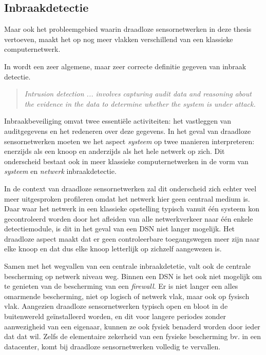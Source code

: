 \subsection{Inbraakdetectie}

Maar ook het probleemgebied waarin draadloze sensornetwerken in deze thesis
vertoeven, maakt het op nog meer vlakken verschillend van een klassieke
computernetwerk.

In \citep{zhang2000intrusion} wordt een zeer algemene, maar zeer correcte
definitie gegeven van inbraak detectie.

\begin{quote}
\emph{Intrusion detection ... involves capturing audit data and reasoning about
the evidence in the data to determine whether the system is under attack.}
\end{quote}

Inbraakbeveiliging omvat twee essenti\"ele activiteiten: het vastleggen van
auditgegevens en het redeneren over deze gegevens. In het geval van draadloze
sensornetwerken moeten we het aspect \emph{systeem} op twee manieren
interpreteren: enerzijds als een knoop en anderzijds als het hele netwerk op
zich. Dit onderscheid bestaat ook in meer klassieke computernetwerken in de
vorm van \emph{systeem} en \emph{netwerk} inbraakdetectie.

In de context van draadloze sensornetwerken zal dit onderscheid zich echter
veel meer uitgesproken profileren omdat het netwerk hier geen centraal medium
is. Daar waar het netwerk in een klassieke opstelling typisch vanuit \'e\'en
systeem kon gecontroleerd worden door het afleiden van alle netwerkverkeer naar
\'e\'en enkele detectiemodule, is dit in het geval van een DSN niet langer
mogelijk. Het draadloze aspect maakt dat er geen controleerbare toegangswegen
meer zijn naar elke knoop en dat dus elke knoop letterlijk op zichzelf
aangewezen is.

Samen met het wegvallen van een centrale inbraakdetetie, valt ook de centrale
bescherming op netwerk niveau weg. Binnen een DSN is het ook niet mogelijk om
te genieten van de bescherming van een \emph{firewall}. Er is niet langer een
alles omarmende bescherming, niet op logisch of netwerk vlak, maar ook op
fysisch vlak. Aangezien draadloze sensornetwerken typisch open en bloot in de
buitenwereld ge\"installeerd worden, en dit voor langere periodes zonder
aanwezigheid van een eigenaar, kunnen ze ook fysiek benaderd worden door ieder
dat dat wil. Zelfs de elementaire zekerheid van een fysieke bescherming bv. in
een datacenter, komt bij draadloze sensornetwerken volledig te vervallen.

